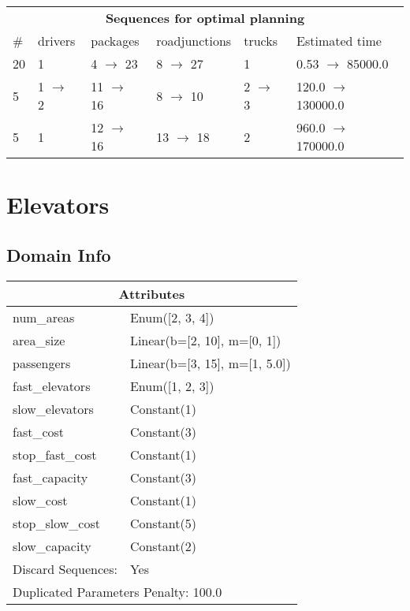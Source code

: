 \documentclass{article}
\begin{document}
                            \begin{center}
                            \begin{tabular}{l|l|l|l|l|l}
                            \multicolumn{6}{c}{\bf \large Sequences for optimal planning}\\
                            \# & drivers & packages & roadjunctions & trucks & Estimated time\\\midrule
                            20&1&4 $\rightarrow$ 23&8 $\rightarrow$ 27&1&0.53 $\rightarrow$ 85000.0\\
5&1 $\rightarrow$ 2&11 $\rightarrow$ 16&8 $\rightarrow$ 10&2 $\rightarrow$ 3&120.0 $\rightarrow$ 130000.0\\
5&1&12 $\rightarrow$ 16&13 $\rightarrow$ 18&2&960.0 $\rightarrow$ 170000.0
                            \end{tabular}
                            \end{center}
                    \newpage \section{Elevators}
                    \subsection*{Domain Info}

                    \begin{center}
                    \begin{tabular}{p{}p{}}
                    \multicolumn{2}{c}{\bf \large Attributes}\\\midrule
                    num\_areas & Enum([2, 3, 4])\\
area\_size & Linear(b=[2, 10], m=[0, 1])\\
passengers & Linear(b=[3, 15], m=[1, 5.0])\\
fast\_elevators & Enum([1, 2, 3])\\
slow\_elevators & Constant(1)\\
fast\_cost & Constant(3)\\
stop\_fast\_cost & Constant(1)\\
fast\_capacity & Constant(3)\\
slow\_cost & Constant(1)\\
stop\_slow\_cost & Constant(5)\\
slow\_capacity & Constant(2)
                    
                    
                                \\\midrule
                                Discard Sequences: & Yes
                             \\\midrule
                    \multicolumn{2}{l}{Duplicated Parameters Penalty: 100.0}
                    \end{tabular}
                    \end{center}
                
\end{document}
